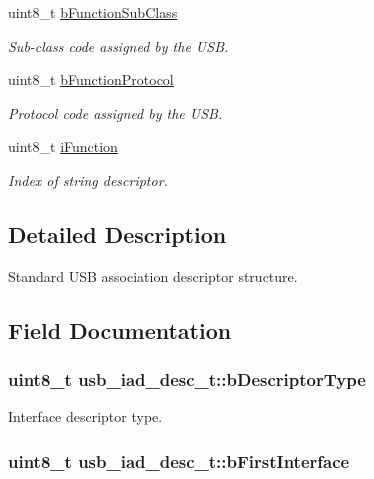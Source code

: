 \begin{DoxyCompactItemize}
uint8\-\_\-t \hyperlink{structusb__iad__desc__t_a32c8d93140dbad4009d6a0027b3ac6f2}{b\-Function\-Sub\-Class}
\begin{DoxyCompactList}\small\item\em \-Sub-\/class code assigned by the \-U\-S\-B. \end{DoxyCompactList}\item 
uint8\-\_\-t \hyperlink{structusb__iad__desc__t_ac9ddebd0442428896e30837a4b52f771}{b\-Function\-Protocol}
\begin{DoxyCompactList}\small\item\em \-Protocol code assigned by the \-U\-S\-B. \end{DoxyCompactList}\item 
uint8\-\_\-t \hyperlink{structusb__iad__desc__t_a43d33cc1c219b1cac0c340dbcf1ec107}{i\-Function}
\begin{DoxyCompactList}\small\item\em \-Index of string descriptor. \end{DoxyCompactList}\end{DoxyCompactItemize}


\subsection{\-Detailed \-Description}
\-Standard \-U\-S\-B association descriptor structure. 

\subsection{\-Field \-Documentation}
\hypertarget{structusb__iad__desc__t_aad5b760da92290217db3463a7342a7b4}{
\subsubsection[{b\-Descriptor\-Type}]{\setlength{\rightskip}{0pt plus 5cm}uint8\-\_\-t {\bf usb\-\_\-iad\-\_\-desc\-\_\-t\-::b\-Descriptor\-Type}}}
\label{structusb__iad__desc__t_aad5b760da92290217db3463a7342a7b4}


\-Interface descriptor type. 

\hypertarget{structusb__iad__desc__t_a0d32a4f394cd5bc64295725434eeccfd}{
\subsubsection[{b\-First\-Interface}]{\setlength{\rightskip}{0pt plus 5cm}uint8\-\_\-t {\bf usb\-\_\-iad\-\_\-desc\-\_\-t\-::b\-First\-Interface}}}
\label{structusb__iad__desc__t_a0d32a4f394cd5bc64295725434eeccfd}


